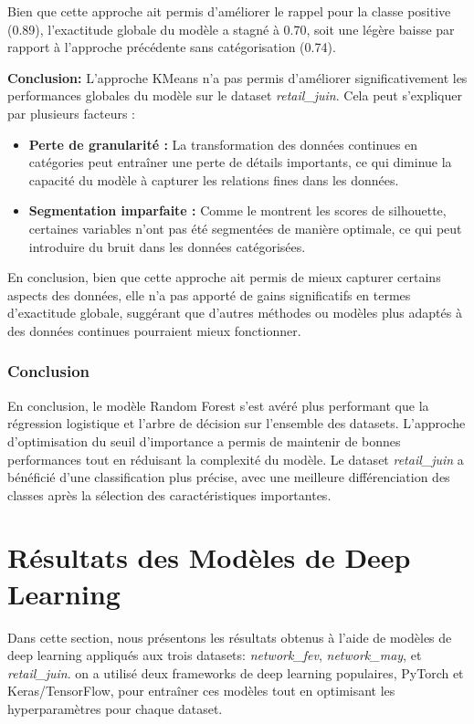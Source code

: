 Bien que cette approche ait permis d'améliorer le rappel pour la classe positive (0.89), l'exactitude globale du modèle a stagné à 0.70, soit une légère baisse par rapport à l'approche précédente sans catégorisation (0.74). 

\textbf{Conclusion:} L'approche KMeans n'a pas permis d'améliorer significativement les performances globales du modèle sur le dataset \textit{retail\_juin}. Cela peut s'expliquer par plusieurs facteurs :

\begin{itemize}
    \item \textbf{Perte de granularité :} La transformation des données continues en catégories peut entraîner une perte de détails importants, ce qui diminue la capacité du modèle à capturer les relations fines dans les données.
    \item \textbf{Segmentation imparfaite :} Comme le montrent les scores de silhouette, certaines variables n'ont pas été segmentées de manière optimale, ce qui peut introduire du bruit dans les données catégorisées.
\end{itemize}

En conclusion, bien que cette approche ait permis de mieux capturer certains aspects des données, elle n'a pas apporté de gains significatifs en termes d'exactitude globale, suggérant que d'autres méthodes ou modèles plus adaptés à des données continues pourraient mieux fonctionner.

\subsubsection{Conclusion}

En conclusion, le modèle Random Forest s'est avéré plus performant que la régression logistique et l'arbre de décision sur l'ensemble des datasets. L'approche d'optimisation du seuil d'importance a permis de maintenir de bonnes performances tout en réduisant la complexité du modèle. Le dataset \textit{retail\_juin} a bénéficié d'une classification plus précise, avec une meilleure différenciation des classes après la sélection des caractéristiques importantes.

\section{Résultats des Modèles de Deep Learning}

Dans cette section, nous présentons les résultats obtenus à l'aide de modèles de deep learning appliqués aux trois datasets: \textit{network\_fev}, \textit{network\_may}, et \textit{retail\_juin}. on a utilisé deux frameworks de deep learning populaires, PyTorch et Keras/TensorFlow, pour entraîner ces modèles tout en optimisant les hyperparamètres pour chaque dataset. 

